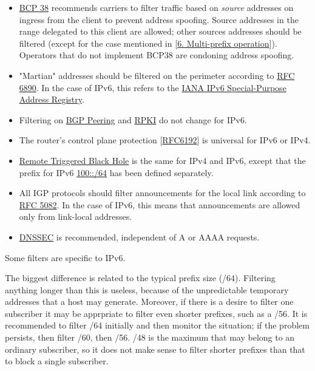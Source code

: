 \documentclass[
]{article}
\providecommand{\tightlist}{%
  \setlength{\itemsep}{0pt}\setlength{\parskip}{0pt}}
\begin{document}
\begin{itemize}
\tightlist
\item
  \href{https://www.rfc-editor.org/info/bcp38}{BCP 38} recommends
  carriers to filter traffic based on \emph{source} addresses on ingress
  from the client to prevent address spoofing. Source addresses in the
  range delegated to this client are allowed; other sources addresses
  should be filtered (except for the case mentioned in
  {[}\hyperref[multi-prefix-operation]{6. Multi-prefix operation}{]}).
  Operators that do not implement BCP38 are condoning address spoofing.
\item
  "Martian" addresses should be filtered on the perimeter according to
  \href{https://www.rfc-editor.org/info/rfc6890}{RFC 6890}. In the case
  of IPv6, this refers to the
  \href{https://www.iana.org/assignments/iana-ipv6-special-registry/iana-ipv6-special-registry.xhtml}{IANA
  IPv6 Special-Purpose Address Registry}.
\item
  Filtering on \href{https://www.rfc-editor.org/info/rfc7454}{BGP
  Peering} and \href{https://www.rfc-editor.org/info/rfc8210}{RPKI} do
  not change for IPv6.
\item
  The router's control plane protection
  {[}\href{https://www.rfc-editor.org/info/rfc6192}{RFC6192}{]} is
  universal for IPv6 or IPv4.
\item
  \href{https://www.rfc-editor.org/info/rfc5635}{Remote Triggered Black
  Hole} is the same for IPv4 and IPv6, except that the prefix for IPv6
  \href{https://www.rfc-editor.org/info/rfc6666}{100::/64} has been
  defined separately.
\item
  All IGP protocols should filter announcements for the local link
  according to \href{https://www.rfc-editor.org/info/rfc5082}{RFC 5082}.
  In the case of IPv6, this means that announcements are allowed only
  from link-local addresses.
\item
  \href{https://www.rfc-editor.org/info/rfc4641}{DNSSEC} is recommended,
  independent of A or AAAA requests.
\end{itemize}

Some filters are specific to IPv6.

The biggest difference is related to the typical prefix size (/64).
Filtering anything longer than this is useless, because of the
unpredictable temporary addresses that a host may generate. Moreover, if
there is a desire to filter one subscriber it may be apprpriate to
filter even shorter prefixes, such as a /56. It is recommended to filter
/64 initially and then monitor the situation; if the problem persists,
then filter /60, then /56. /48 is the maximum that may belong to an
ordinary subscriber, so it does not make sense to filter shorter
prefixes than that to block a single subscriber.
\end{document}
